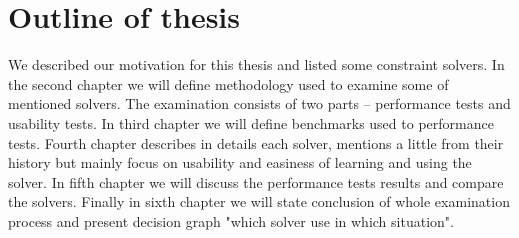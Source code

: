 \section{Outline of thesis}
We described our motivation for this thesis and listed some constraint solvers. In the second chapter we will define methodology used to examine some of mentioned solvers. The examination consists of two parts -- performance tests and usability tests. In third chapter we will define benchmarks used to performance tests. Fourth chapter describes in details each solver, mentions a little from their history but mainly focus on usability and easiness of learning and using the solver. In fifth chapter we will discuss the performance tests results and compare the solvers. Finally in sixth chapter we will state conclusion of whole examination process and present decision graph "which solver use in which situation".

